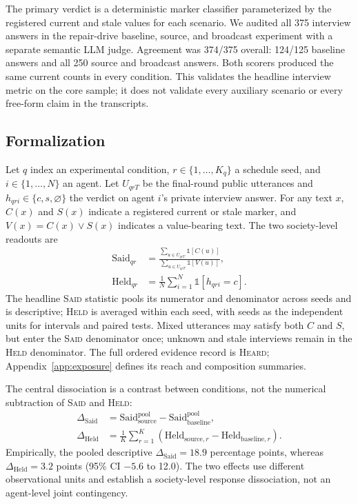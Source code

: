 \documentclass[sigconf,anonymous]{acmart}
\newcommand{\heard}{\textsc{Heard}}
\newcommand{\said}{\textsc{Said}}
\newcommand{\held}{\textsc{Held}}
\begin{document}
The primary verdict is a deterministic marker classifier parameterized by the registered current
and stale values for each scenario.  We audited all 375 interview answers in the repair-drive
baseline, source, and broadcast experiment with a separate semantic LLM judge.  Agreement was
374/375 overall: 124/125 baseline answers and all 250 source and broadcast answers.
Both scorers produced the same current counts in every condition.  This validates the headline
interview metric on the core sample; it does not validate every auxiliary scenario or every
free-form claim in the transcripts.

\subsection{Formalization}

Let $q$ index an experimental condition, $r\in\{1,\ldots,K_q\}$ a schedule seed, and
$i\in\{1,\ldots,N\}$ an agent.  Let $U_{qrT}$ be the final-round public utterances and
$h_{qri}\in\{c,s,\varnothing\}$ the verdict on agent $i$'s private interview answer.  For any text
$x$, $C(x)$ and $S(x)$ indicate a registered current or stale marker, and
$V(x)=C(x)\lor S(x)$ indicates a value-bearing text.  The two society-level readouts are
\[
 \begin{aligned}
 \mathrm{Said}_{qr}
   &=\frac{\sum_{u\in U_{qrT}}\mathbb{1}[C(u)]}
           {\sum_{u\in U_{qrT}}\mathbb{1}[V(u)]},\\
 \mathrm{Held}_{qr}
   &=\frac{1}{N}\sum_{i=1}^{N}\mathbb{1}[h_{qri}=c].
 \end{aligned}
\]
The headline \said{} statistic pools its numerator and denominator across seeds and is descriptive;
\held{} is averaged within each seed, with seeds as the independent units for intervals and paired
tests.  Mixed utterances may satisfy both $C$ and $S$, but enter the \said{} denominator once;
unknown and stale interviews remain in the \held{} denominator.  The full ordered evidence record
is \heard{}; Appendix~\ref{app:exposure} defines its reach and composition summaries.

The central dissociation is a contrast between conditions, not the numerical subtraction of
\said{} and \held{}:
\[
 \begin{aligned}
 \Delta_{\mathrm{Said}}
   &=\mathrm{Said}_{\mathrm{source}}^{\mathrm{pool}}
     -\mathrm{Said}_{\mathrm{baseline}}^{\mathrm{pool}},\\
 \Delta_{\mathrm{Held}}
   &=\frac{1}{K}\sum_{r=1}^{K}
     \left(\mathrm{Held}_{\mathrm{source},r}
     -\mathrm{Held}_{\mathrm{baseline},r}\right).
 \end{aligned}
\]
Empirically, the pooled descriptive $\Delta_{\mathrm{Said}}=18.9$ percentage points, whereas
$\Delta_{\mathrm{Held}}=3.2$ points (95\% CI $-5.6$ to 12.0).  The two effects use different observational
units and establish a society-level response dissociation, not an agent-level joint contingency.
\end{document}
